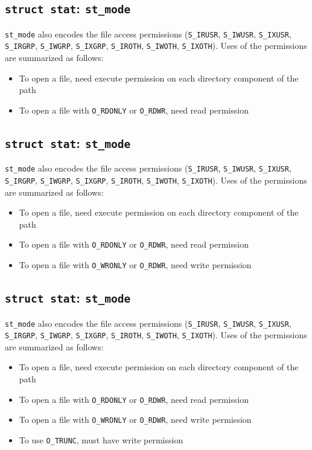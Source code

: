 \documentclass[xga]{xdvislides}
\begin{document}
\subsection{{\tt struct stat}: {\tt st\_mode}}
{\tt st\_mode} also encodes the file access permissions ({\tt S\_IRUSR},
{\tt S\_IWUSR}, {\tt S\_IXUSR}, {\tt S\_IRGRP}, {\tt S\_IWGRP}, {\tt S\_IXGRP},
{\tt S\_IROTH}, {\tt S\_IWOTH}, {\tt S\_IXOTH}).  Uses of the permissions are
summarized as follows:

\begin{itemize}
	\item To open a file, need execute permission on each directory component of the path
	\item To open a file with {\tt O\_RDONLY} or {\tt O\_RDWR}, need read permission
\end{itemize}

\subsection{{\tt struct stat}: {\tt st\_mode}}
{\tt st\_mode} also encodes the file access permissions ({\tt S\_IRUSR},
{\tt S\_IWUSR}, {\tt S\_IXUSR}, {\tt S\_IRGRP}, {\tt S\_IWGRP}, {\tt S\_IXGRP},
{\tt S\_IROTH}, {\tt S\_IWOTH}, {\tt S\_IXOTH}).  Uses of the permissions are
summarized as follows:

\begin{itemize}
	\item To open a file, need execute permission on each directory component of the path
	\item To open a file with {\tt O\_RDONLY} or {\tt O\_RDWR}, need read permission
	\item To open a file with {\tt O\_WRONLY} or {\tt O\_RDWR}, need write permission
\end{itemize}

\subsection{{\tt struct stat}: {\tt st\_mode}}
{\tt st\_mode} also encodes the file access permissions ({\tt S\_IRUSR},
{\tt S\_IWUSR}, {\tt S\_IXUSR}, {\tt S\_IRGRP}, {\tt S\_IWGRP}, {\tt S\_IXGRP},
{\tt S\_IROTH}, {\tt S\_IWOTH}, {\tt S\_IXOTH}).  Uses of the permissions are
summarized as follows:

\begin{itemize}
	\item To open a file, need execute permission on each directory component of the path
	\item To open a file with {\tt O\_RDONLY} or {\tt O\_RDWR}, need read permission
	\item To open a file with {\tt O\_WRONLY} or {\tt O\_RDWR}, need write permission
	\item To use {\tt O\_TRUNC}, must have write permission
\end{itemize}
\end{document}

